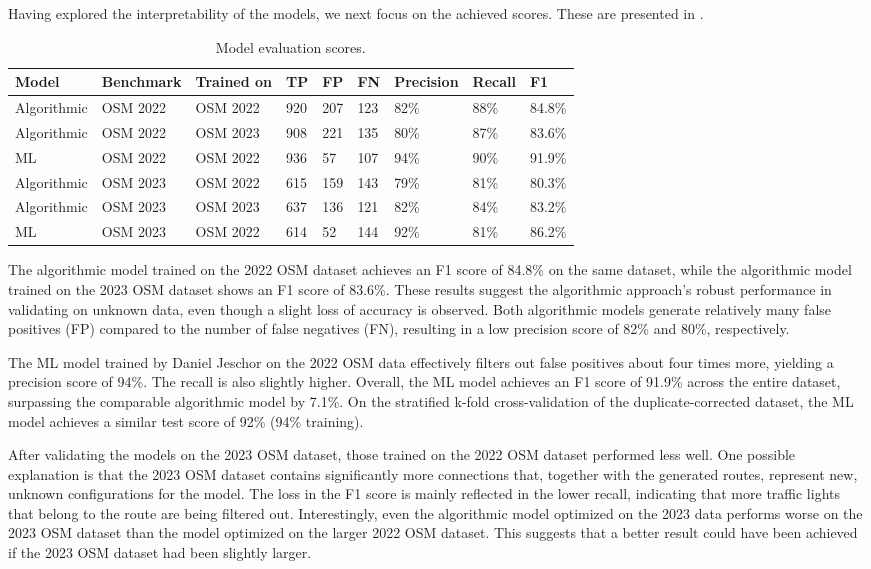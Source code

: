 Having explored the interpretability of the models, we next focus on the achieved scores. These are presented in .

\begin{table}[ht]
\caption{Model evaluation scores.}
\begin{tabular}{@{}lllllllll@{}}
\toprule
  \textbf{Model} & \textbf{Benchmark} & \textbf{Trained on} & \textbf{TP} & \textbf{FP} & \textbf{FN} & \textbf{Precision} & \textbf{Recall} & \textbf{F1} \\
  \midrule
  Algorithmic & OSM 2022 & OSM 2022 & 920 & 207 & 123 & 82\% & 88\% & 84.8\% \\
  Algorithmic & OSM 2022 & OSM 2023 & 908 & 221 & 135 & 80\% & 87\% & 83.6\% \\
  ML          & OSM 2022 & OSM 2022 & 936 & 57 & 107 & 94\% & 90\% & 91.9\% \\
  \midrule
  Algorithmic & OSM 2023 & OSM 2022 & 615 & 159 & 143 & 79\% & 81\% & 80.3\% \\
  Algorithmic & OSM 2023 & OSM 2023 & 637 & 136 & 121 & 82\% & 84\% & 83.2\% \\
  ML          & OSM 2023 & OSM 2022 & 614 & 52 & 144 & 92\% & 81\% & 86.2\% \\
\bottomrule
\end{tabular}
\label{tab:model-scores}
\end{table}

The algorithmic model trained on the 2022 OSM dataset achieves an F1 score of 84.8\% on the same dataset, while the algorithmic model trained on the 2023 OSM dataset shows an F1 score of 83.6\%. These results suggest the algorithmic approach's robust performance in validating on unknown data, even though a slight loss of accuracy is observed. Both algorithmic models generate relatively many false positives (FP) compared to the number of false negatives (FN), resulting in a low precision score of 82\% and 80\%, respectively.

The ML model trained by Daniel Jeschor \cite{jeschor_2022} on the 2022 OSM data effectively filters out false positives about four times more, yielding a precision score of 94\%. The recall is also slightly higher. Overall, the ML model achieves an F1 score of 91.9\% across the entire dataset, surpassing the comparable algorithmic model by 7.1\%. On the stratified k-fold cross-validation of the duplicate-corrected dataset, the ML model achieves a similar test score of 92\% (94\% training).

After validating the models on the 2023 OSM dataset, those trained on the 2022 OSM dataset performed less well. One possible explanation is that the 2023 OSM dataset contains significantly more connections that, together with the generated routes, represent new, unknown configurations for the model. The loss in the F1 score is mainly reflected in the lower recall, indicating that more traffic lights that belong to the route are being filtered out. Interestingly, even the algorithmic model optimized on the 2023 data performs worse on the 2023 OSM dataset than the model optimized on the larger 2022 OSM dataset. This suggests that a better result could have been achieved if the 2023 OSM dataset had been slightly larger.

